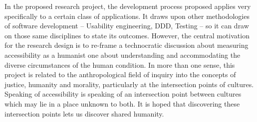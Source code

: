 In the proposed research project, the development process proposed applies very specifically to a certain class of applications. It draws upon other methodologies of software development -- Usability engineering, \acl{DDD}, Testing -- so it can draw on those same disciplines to state its outcomes. However, the central motivation for the research design is to re-frame a technocratic discussion about measuring accessibility as a humanist one about understanding and accommodating the diverse circumstances of the human condition. In more than one sense, this project is related to the anthropological field of inquiry into the concepts of justice, humanity and morality, particularly at the intersection points of cultures. Speaking of accessibility is speaking of an intersection point between cultures which may lie in a place unknown to both. It is hoped that discovering these intersection points lets us discover shared humanity.


